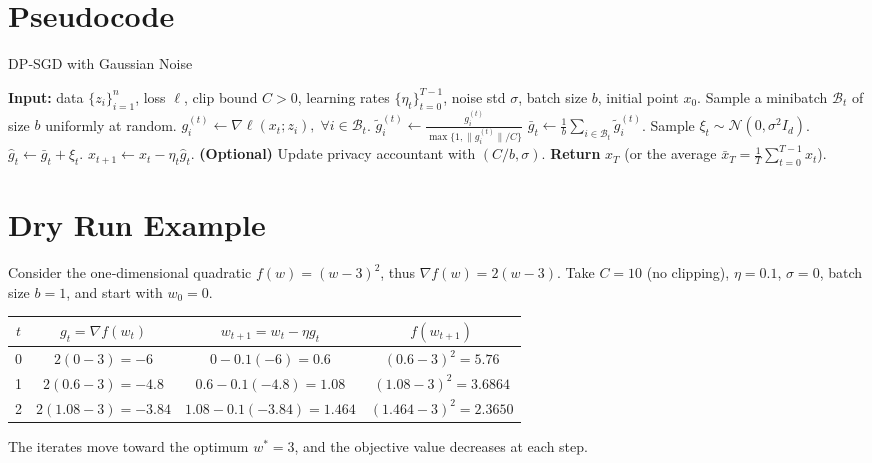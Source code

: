 \documentclass{article}
\begin{document}
\section*{Pseudocode}
\begin{algorithm}[H]
\caption{DP‑SGD with Gaussian Noise}
\begin{algorithmic}[1]
\State \textbf{Input:} data $\{z_i\}_{i=1}^{n}$, loss $\ell$, clip bound $C>0$, 
learning rates $\{\eta_t\}_{t=0}^{T-1}$, noise std $\sigma$, batch size $b$, 
initial point $x_0$.
    \State Sample a minibatch $\mathcal B_t$ of size $b$ uniformly at random.
    \State $\displaystyle g_i^{(t)}\gets\nabla\ell(x_t;z_i),\;\forall i\in\mathcal B_t$.
    \State $\displaystyle \tilde g_i^{(t)}\gets 
        \frac{g_i^{(t)}}{\max\{1,\|g_i^{(t)}\|/C\}}$   
    \State $\displaystyle \bar g_t\gets\frac{1}{b}\sum_{i\in\mathcal B_t}\tilde g_i^{(t)}$.
    \State Sample $\xi_t\sim\mathcal N(0,\sigma^{2}I_d)$.
    \State $\displaystyle \hat g_t\gets\bar g_t+\xi_t$.
    \State $x_{t+1}\gets x_t-\eta_t\hat g_t$.
    \State \textbf{(Optional)} Update privacy accountant with $(C/b,\sigma)$.
\EndFor
\State \textbf{Return} $x_T$ (or the average $\bar x_T=\frac1T\sum_{t=0}^{T-1}x_t$).
\end{algorithmic}
\end{algorithm}

\section*{Dry Run Example}
Consider the one‑dimensional quadratic $f(w)=(w-3)^2$, thus $\nabla f(w)=2(w-3)$.
Take $C=10$ (no clipping), $\eta=0.1$, $\sigma=0$, batch size $b=1$, and start
with $w_0=0$.

\begin{center}
\begin{tabular}{c|c|c|c}
$t$ & $g_t=\nabla f(w_t)$ & $w_{t+1}=w_t-\eta g_t$ & $f(w_{t+1})$\\ \hline
0 & $2(0-3)=-6$ & $0-0.1(-6)=0.6$ & $(0.6-3)^2=5.76$\\
1 & $2(0.6-3)=-4.8$ & $0.6-0.1(-4.8)=1.08$ & $(1.08-3)^2=3.6864$\\
2 & $2(1.08-3)=-3.84$ & $1.08-0.1(-3.84)=1.464$ & $(1.464-3)^2=2.3650$\\
\end{tabular}
\end{center}
The iterates move toward the optimum $w^{*}=3$, and the objective value
decreases at each step.
\end{document}
